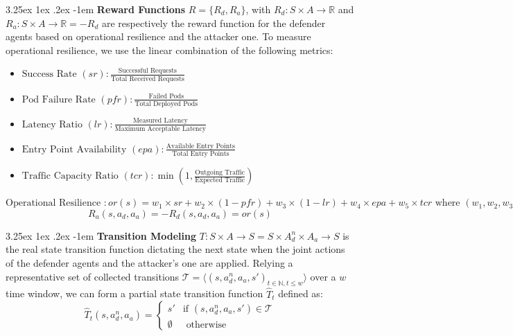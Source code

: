 \documentclass[conference]{IEEEtran}
\makeatletter
\renewcommand\paragraph{\@startsection{paragraph}{5}{\z@}%
  {3.25ex \@plus1ex \@minus.2ex}%
  {-1em}%
  {\normalfont\normalsize\bfseries}}
\makeatother
\begin{document}
\noindent \paragraph{\textbf{Reward Functions}} $R = \{R_d, R_a\}$, with $R_d: S \times A \to \mathbb{R}$ and $R_a: S \times A \to \mathbb{R} = - R_d$ are respectively the reward function for the defender agents based on operational resilience and the attacker one.
To measure operational resilience, we use the linear combination of the following metrics:
%
\begin{itemize}
    \item $\text{Success Rate } (sr) : \frac{\text{Successful Requests}}{\text{Total Received Requests}}$

    \item $\text{Pod Failure Rate } (pfr) : \frac{\text{Failed Pods}}{\text{Total Deployed Pods}}$
    
    \item $\text{Latency Ratio } (lr) : \frac{\text{Measured Latency}}{\text{Maximum Acceptable Latency}}$
    
    \item $\text{Entry Point Availability } (epa) : \frac{\text{Available Entry Points}}{\text{Total Entry Points}}$
    
    \item $\text{Traffic Capacity Ratio } (tcr) : \min\left(1, \frac{\text{Outgoing Traffic}}{\text{Expected Traffic}}\right)$
\end{itemize}
%
$\text{Operational Resilience }: or(s) = w_1 \times sr
\allowbreak + w_2 \times (1 - pfr)
\allowbreak + w_3 \times (1 - lr)
\allowbreak + w_4 \times epa
\allowbreak + w_5 \times tcr
\text{ where } (w_1, w_2, w_3, w_4, w_5) \text{ are relative weights.}$
$$
R_a(s, a_d, a_a) = -R_d(s, a_d, a_a) = or(s)
$$

\noindent \paragraph{\textbf{Transition Modeling}} $T: S \times A \rightarrow S = S \times A_d^n \times A_a \to S$ is the real state transition function dictating the next state when the joint actions of the defender agents and the attacker's one are applied. Relying a representative set of collected transitions $\mathcal{T} = \langle(s, a_d^n, a_a, s')_{t\in \mathbb{N}, t \leq w}\rangle$ over a $w$ time window, we can form a partial state transition function $\hat{T}_t$ defined as:
%
$$
\hat{T}_t(s, a_d^n, a_a) =
\begin{cases} 
    s' & \text{if } (s, a_d^n, a_a, s') \in \mathcal{T} \\
    \emptyset & \text{ otherwise}
\end{cases}
$$
\end{document}
